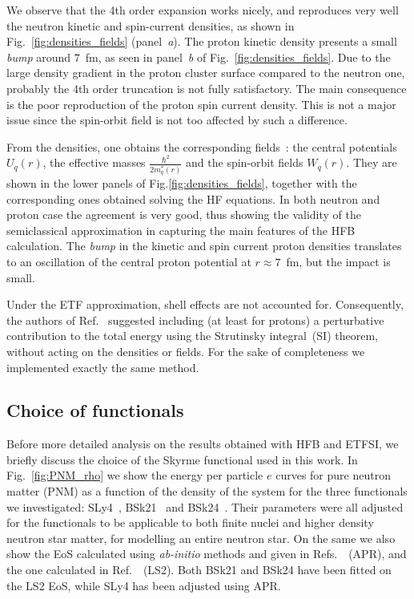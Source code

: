 \documentclass[
    amsmath,amssymb,
    aps,
    prc,
    floatfix,
]{revtex4-2}
\begin{document}
We observe that the 4th order expansion works nicely, and reproduces very well the neutron kinetic and spin-current densities, as shown in Fig.~\ref{fig:densities_fields} (panel~\emph{a}). The proton kinetic density presents a small \emph{bump} around $7$~fm, as seen in panel~\emph{b} of Fig.~\ref{fig:densities_fields}. Due to the large density gradient in the proton cluster surface compared to the neutron one, probably the 4th order truncation is not fully satisfactory. The main consequence is the poor reproduction of the proton spin current density. This is not a major issue since the spin-orbit field is not too affected by such a difference.

From the densities, one obtains the corresponding fields~\cite{perlinska2004local}: the central potentials $U_q(r)$, the effective masses $\frac{\hbar^2}{2m_q^*(r)}$ and the spin-orbit fields $W_q(r)$. They are shown in the lower panels of Fig.\ref{fig:densities_fields}, together with the corresponding ones obtained solving the HF equations. In both neutron and proton case the agreement is very good, thus showing the validity of the semiclassical approximation in capturing the main features of the HFB calculation. The \emph{bump} in the kinetic and spin current proton densities translates to an oscillation of the central proton potential at $r\approx7$~fm, but the impact is small.

Under the ETF approximation, shell effects are not accounted for. Consequently, the authors of Ref.~\cite{onsi2008semi} suggested including (at least for protons) a perturbative contribution to the total energy using the Strutinsky integral~(SI) theorem, without acting on the densities or fields. For the sake of completeness we implemented exactly the same method. 


\subsection{Choice of functionals}\label{subsec:functionals}

Before more detailed analysis on the results obtained with HFB and ETFSI, we briefly discuss the choice of the Skyrme functional used in this work.
In Fig.~\ref{fig:PNM_rho} we show the energy per particle $e$ curves for pure neutron matter (PNM) as a function of the density of the system for the three functionals we investigated: SLy4~\cite{chabanat1998skyrme}, BSk21~\cite{pearsonInnerCrustNeutron2012} and BSk24~\cite{goriely2013further}. Their parameters were all adjusted for the functionals to be applicable to both finite nuclei and higher density neutron star matter, for modelling an entire neutron star.
On the same we also show the EoS calculated using \emph{ab-initio} methods and given in Refs.~\cite{wiringaEquationStateDense1988,wiringaDeuteronsNeutronStars1993}~(APR), and the one calculated in Ref.~\cite{liNeutronStarStructure2008}~(LS2).
Both BSk21 and BSk24 have been fitted on the LS2 EoS, while SLy4 has been adjusted using APR.
\end{document}
